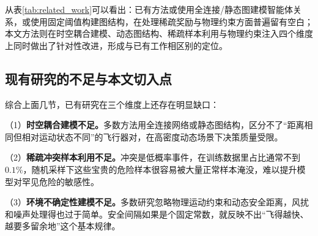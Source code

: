 \documentclass[12pt,a4paper,UTF8]{ctexart}
\begin{document}
\begin{table}[H]
    \centering
    \caption{本文方法与代表性相关工作的系统性对比}
    \label{tab:related_work}
\end{table}

从表\ref{tab:related_work}可以看出：已有方法或使用全连接/静态图建模智能体关系，或使用固定阈值构建图结构，在处理稀疏奖励与物理约束方面普遍留有空白；本文方法则在时空耦合建模、动态图结构、稀疏样本利用与物理约束注入四个维度上同时做出了针对性改进，形成与已有工作相区别的定位。

\subsection{现有研究的不足与本文切入点}

综合上面几节，已有研究在三个维度上还存在明显缺口：

（1）\textbf{时空耦合建模不足。}多数方法用全连接网络或静态图结构\cite{ref8,ref10,ref11}，区分不了“距离相同但相对运动状态不同”的飞行器对，在高密度动态场景下决策质量受限。

（2）\textbf{稀疏冲突样本利用不足。}冲突是低概率事件，在训练数据里占比通常不到$0.1\%$\cite{ref12,ref13}，随机采样下这些宝贵的危险样本很容易被大量正常样本淹没，难以提升模型对罕见危险的敏感性。

（3）\textbf{环境不确定性建模不足。}多数研究忽略物理运动约束和动态安全距离\cite{ref11}，风扰和噪声处理得也过于简单。安全间隔如果是个固定常数，就反映不出“飞得越快、越要多留余地”这个基本规律。
\end{document}
